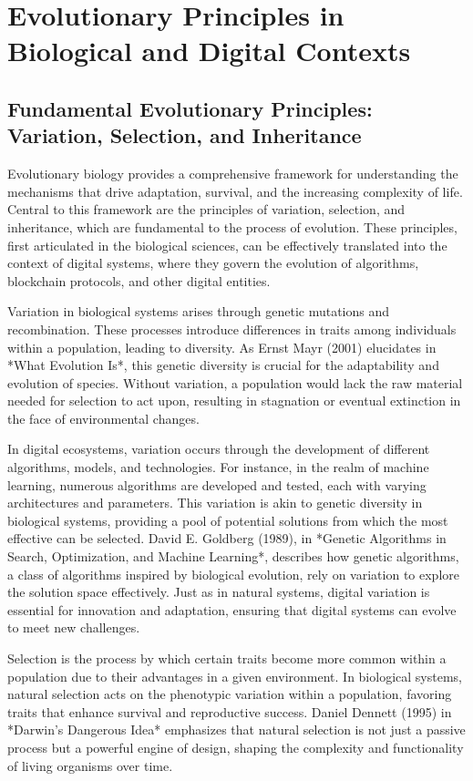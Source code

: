 \documentclass[12pt,twoside]{article}
\begin{document}
\section{Evolutionary Principles in Biological and Digital Contexts}

\subsection{Fundamental Evolutionary Principles: Variation, Selection, and Inheritance}

Evolutionary biology provides a comprehensive framework for understanding the mechanisms that drive adaptation, survival, and the increasing complexity of life. Central to this framework are the principles of variation, selection, and inheritance, which are fundamental to the process of evolution. These principles, first articulated in the biological sciences, can be effectively translated into the context of digital systems, where they govern the evolution of algorithms, blockchain protocols, and other digital entities.

Variation in biological systems arises through genetic mutations and recombination. These processes introduce differences in traits among individuals within a population, leading to diversity. As Ernst Mayr (2001) elucidates in *What Evolution Is*, this genetic diversity is crucial for the adaptability and evolution of species. Without variation, a population would lack the raw material needed for selection to act upon, resulting in stagnation or eventual extinction in the face of environmental changes.

In digital ecosystems, variation occurs through the development of different algorithms, models, and technologies. For instance, in the realm of machine learning, numerous algorithms are developed and tested, each with varying architectures and parameters. This variation is akin to genetic diversity in biological systems, providing a pool of potential solutions from which the most effective can be selected. David E. Goldberg (1989), in *Genetic Algorithms in Search, Optimization, and Machine Learning*, describes how genetic algorithms, a class of algorithms inspired by biological evolution, rely on variation to explore the solution space effectively. Just as in natural systems, digital variation is essential for innovation and adaptation, ensuring that digital systems can evolve to meet new challenges.

Selection is the process by which certain traits become more common within a population due to their advantages in a given environment. In biological systems, natural selection acts on the phenotypic variation within a population, favoring traits that enhance survival and reproductive success. Daniel Dennett (1995) in *Darwin's Dangerous Idea* emphasizes that natural selection is not just a passive process but a powerful engine of design, shaping the complexity and functionality of living organisms over time.
\end{document}

